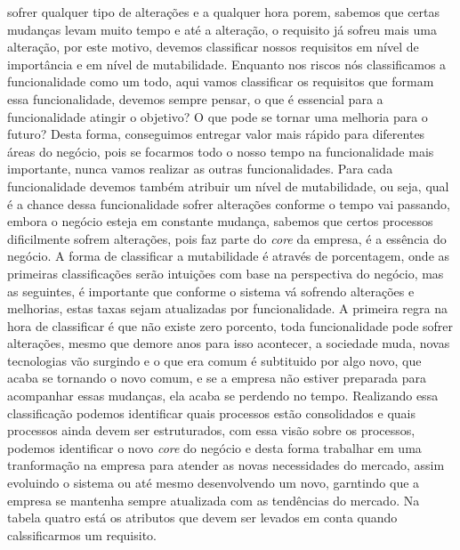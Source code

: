       sofrer qualquer tipo de alterações e a qualquer hora porem, sabemos que certas
      mudanças levam muito tempo e até a alteração, o requisito já sofreu mais uma
      alteração, por este motivo, devemos classificar nossos requisitos em nível
      de importância e em nível de mutabilidade. Enquanto nos riscos nós classificamos
      a funcionalidade como um todo, aqui vamos classificar os requisitos que formam
      essa funcionalidade, devemos sempre pensar, o que é essencial para a funcionalidade
      atingir o objetivo? O que pode se tornar uma melhoria para o futuro? Desta
      forma, conseguimos entregar valor mais rápido para diferentes áreas do negócio,
      pois se focarmos todo o nosso tempo na funcionalidade mais importante, nunca
      vamos realizar as outras funcionalidades. Para cada funcionalidade devemos
      também atribuir um nível de mutabilidade, ou seja, qual é a chance dessa
      funcionalidade sofrer alterações conforme o tempo vai passando, embora o
      negócio esteja em constante mudança, sabemos que certos processos dificilmente
      sofrem alterações, pois faz parte do \textit{core} da empresa, é a essência
      do negócio. A forma de classificar a mutabilidade é através de porcentagem,
      onde as primeiras classificações serão intuições com base na perspectiva do
      negócio, mas as seguintes, é importante que conforme o sistema vá sofrendo
      alterações e melhorias, estas taxas sejam atualizadas por funcionalidade.
      A primeira regra na hora de classificar é que não existe zero porcento, toda
      funcionalidade pode sofrer alterações, mesmo que demore anos para isso acontecer,
      a sociedade muda, novas tecnologias vão surgindo e o que era comum é subtituido
      por algo novo, que acaba se tornando o novo comum, e se a empresa não estiver
      preparada para acompanhar essas mudanças, ela acaba se perdendo no tempo.
      Realizando essa classificação podemos identificar quais processos estão
      consolidados e quais processos ainda devem ser estruturados, com essa visão
      sobre os processos, podemos identificar o novo \textit{core} do negócio e
      desta forma trabalhar em uma tranformação na empresa para atender as novas
      necessidades do mercado, assim evoluindo o sistema ou até mesmo desenvolvendo
      um novo, garntindo que a empresa se mantenha sempre atualizada com as tendências
      do mercado. Na tabela quatro está os atributos que devem ser levados em conta
      quando calssificarmos um requisito.\newline


